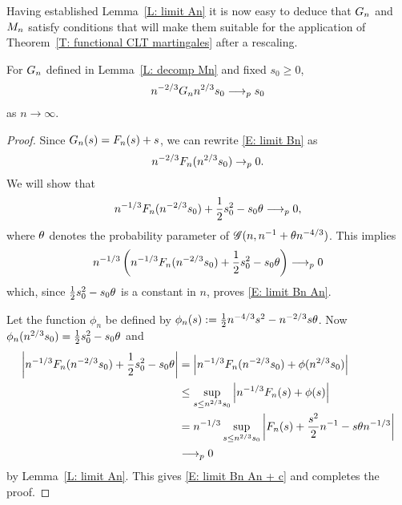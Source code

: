 Having established Lemma~\ref{L: limit An} it is now easy to deduce that $G_n$ and $M_n$ satisfy conditions 
that will make them suitable for the application of Theorem~\ref{T: functional CLT martingales} after a rescaling.

\begin{lemma} \label{L: limit Bn}
	For $G_n$ defined in Lemma~\ref{L: decomp Mn} and fixed $s_0 \geq 0$,
	\begin{equation} \label{E: limit Bn}
	n^{-2 / 3} G_n{n^{2 / 3}s_0} \longrightarrow_p s_0
	\end{equation}
	as $n \rightarrow \infty$.
\end{lemma}

\begin{proof} \label{P: limit Bn}
	Since $G_n(s) = F_n(s) + s$, we can rewrite \eqref{E: limit Bn} as
	\begin{equation} \label{E: limit Bn An}
	n^{-2 / 3} F_n(n^{2 / 3}s_0) \rightarrow_p 0.
	\end{equation}
	We will show that
	\begin{equation} \label{E: limit Bn An + c}
	n^{-1 / 3} F_n(n^{-2 / 3}s_0) + \frac{1}{2}s_0^2 - s_0\theta \longrightarrow_p 0,
	\end{equation}
	where $\theta$ denotes the probability parameter of $\mathscr{G}(n, n^{-1} + \theta n^{-4/3})$. 
	This implies
	\begin{equation*}
	n^{-1 / 3} \left( n^{-1 / 3} F_n(n^{-2 / 3}s_0) + \frac{1}{2}s_0^2 - s_0\theta \right) \longrightarrow_p 0
	\end{equation*}
	which, since $\frac{1}{2}s_0^2 - s_0\theta$ is a constant in $n$, proves \eqref{E: limit Bn An}.
	
	Let the function $\phi_n$ be defined by $\phi_n(s) := \frac{1}{2}n^{-4 / 3}s^2 - n^{-2 / 3}s\theta$.	
	Now $\phi_n(n^{2 / 3}s_0) = \frac{1}{2}s_0^2 - s_0\theta$ and
	\begin{align*}
	\left| n^{-1 / 3} F_n(n^{-2 / 3}s_0) + \frac{1}{2}s_0^2 - s_0\theta \right| 
	&= \left| n^{-1 / 3} F_n(n^{-2 / 3}s_0) + \phi(n^{2 / 3}s_0) \right| \\
	&\leq \sup_{s \leq n^{2 / 3} s_0 } \left| n^{-1 / 3} F_n(s) + \phi(s) \right| \\
	&= n^{-1 / 3} \sup_{s \leq n^{2 / 3} s_0 } \left| F_n(s) + \frac{s^2}{2}n^{-1} - s\theta n^{-1 / 3} \right| \\
	&\longrightarrow_p 0
	\end{align*}
	by Lemma~\ref{L: limit An}. This gives \eqref{E: limit Bn An + c} and completes the proof.
\end{proof}


